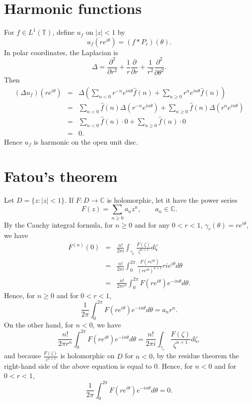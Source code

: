 \documentclass{article}
\begin{document}
\section{Harmonic functions}
For $f \in L^1(\mathbb{T})$, define $u_f$ on $|z|<1$ by
\[
u_f(re^{i\theta})=(f*P_r)(\theta).
\]
In polar coordinates, the Laplacian is
\[
\Delta=\frac{\partial^2}{\partial r^2}+\frac{1}{r}\frac{\partial}{\partial r}+\frac{1}{r^2}\frac{\partial^2}{\partial 
\theta^2}.
\]
Then
\begin{eqnarray*}
(\Delta u_f)(re^{i\theta})&=&\Delta \left( \sum_{n<0} r^{-n} e^{in\theta} \hat{f}(n) + \sum_{n \geq 0} r^n e^{in\theta} \hat{f}(n) \right)\\
&=&\sum_{n<0} \hat{f}(n) \Delta\left(r^{-n} e^{in\theta}\right) + \sum_{n \geq 0} \hat{f}(n)\Delta\left(  r^n e^{in\theta} \right)\\
&=&\sum_{n<0} \hat{f}(n) \cdot 0 + \sum_{n \geq 0} \hat{f}(n) \cdot 0\\
&=&0.
\end{eqnarray*}
Hence $u_f$ is harmonic on the open unit disc.

\section{Fatou's theorem}
\label{fatou}
Let $D=\{z:|z|<1\}$. 
If $F:D \to \mathbb{C}$ is holomorphic, let it have the power series
\[
F(z)=\sum_{n \geq 0} a_n z^n, \qquad a_n \in \mathbb{C}.
\]
By the Cauchy integral formula, for $n \geq 0$ and for any $0<r<1$,  $\gamma_r(\theta)=re^{i\theta}$,  we have
\begin{eqnarray*}
F^{(n)}(0)&=&\frac{n!}{2\pi i} \int_{\gamma_r} \frac{F(\zeta)}{\zeta^{n+1}} d\zeta\\
&=&\frac{n!}{2\pi i} \int_0^{2\pi} \frac{F(re^{i\theta})}{(re^{i\theta})^{n+1}} rie^{i\theta} d\theta\\
&=&\frac{n!}{2\pi r^n} \int_0^{2\pi} F(re^{i\theta}) e^{-in\theta} d\theta.
\end{eqnarray*}
Hence, for $n \geq 0$ and for $0<r<1$,
\[
\frac{1}{2\pi} \int_0^{2\pi} F(re^{i\theta}) e^{-in\theta} d\theta=a_n r^n.
\]
On the other hand, for $n<0$, we have
\[
\frac{n!}{2\pi r^n} \int_0^{2\pi} F(re^{i\theta}) e^{-in\theta} d\theta=\frac{n!}{2\pi i} \int_{\gamma_r} \frac{F(\zeta)}{\zeta^{n+1}} d\zeta,
\]
and because $\frac{F(\zeta)}{ z^{n+1}}$ is holomorphic on $D$ for $n<0$, by the residue theorem the right-hand side of the above equation is equal to $0$. Hence,
for $n < 0$ and for $0<r<1$,
\[
\frac{1}{2\pi} \int_0^{2\pi} F(re^{i\theta}) e^{-in\theta} d\theta=0.
\]
\end{document}
